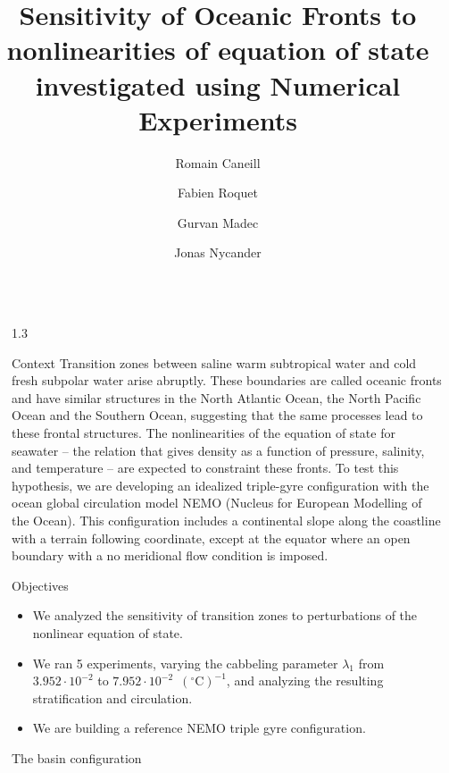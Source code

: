 \documentclass[final]{beamer}
\title{Sensitivity of Oceanic Fronts to nonlinearities of equation of
state investigated using Numerical Experiments}
\author{Romain Caneill \inst{1} \and Fabien Roquet \inst{1}
  \and Gurvan Madec \inst{2} \and Jonas Nycander \inst{3}}
\institute[shortinst]{\inst{1} University of Gothenburg, Sweden
  \samelineand \inst{2} LOCEAN-IPSL Sorbonne university, France
  \samelineand \inst{3} Stockholm University, Sweden}
\newlength{\sepwidth}
\newlength{\colwidth}
\newcommand{\separatorcolumn}{\begin{column}{\sepwidth}\end{column}}
\begin{document}
\begin{frame}[t]
\begin{columns}[t]
\separatorcolumn

\begin{column}{1.3\colwidth}
  \vspace{1.65cm}
  \begin{block}{Context}
    Transition zones between saline warm subtropical water and
    cold fresh subpolar water arise
    abruptly. These boundaries are called oceanic fronts
    and have similar structures in the North
    Atlantic Ocean, the North Pacific Ocean and
    the Southern Ocean, suggesting that the same
    processes lead to these frontal structures.
    The nonlinearities of
    the equation of state for seawater -- the
    relation that gives density as a function of
    pressure, salinity, and temperature --
    are expected to constraint these fronts.
    To test this hypothesis, we are developing
    an idealized triple-gyre configuration with the
    ocean global circulation model NEMO (Nucleus for
    European Modelling of the Ocean). This
    configuration includes a continental slope
    along the coastline with a terrain following
    coordinate, except at the equator where an open
    boundary with a no meridional flow
    condition is imposed.
  \end{block}

  \begin{alertblock}{Objectives}
    \begin{itemize}
    \item We analyzed the sensitivity of transition zones to perturbations of the
      nonlinear equation of state.
    \item We ran 5 experiments, varying the cabbeling
      parameter $\lambda_1$ from $3.952 \cdot 10^{-2}$ to $7.952 \cdot 10^{-2}$
      \,$(^\circ\text{C})^{-1}$, and analyzing the resulting
      stratification and circulation.
    \item We are building a reference NEMO triple gyre configuration.
    \end{itemize}
  \end{alertblock}

  \begin{block}{The basin configuration}
\end{block}
\end{column}
\end{columns}
\end{frame}
\end{document}
